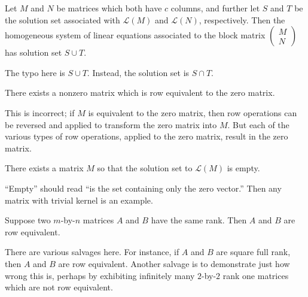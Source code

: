 \documentclass{homework}
\begin{document}
\begin{problem}
  Let $M$ and $N$ be matrices which both have $c$ columns, and further
  let $S$ and $T$ be the solution set associated with $\mathcal{L}(M)$
  and $\mathcal{L}(N)$, respectively.  Then the homogeneous system of
  linear equations associated to the block matrix $\begin{pmatrix} M \\
    N \end{pmatrix}$ has solution set $S \cup T$.
\end{problem}

\begin{solution}
  The typo here is  $S \cup T$.  Instead, the solution set is $S \cap T$.
\end{solution}

\begin{problem}
  There exists a nonzero matrix which is row equivalent to the zero matrix.
\end{problem}

\begin{solution}
  This is incorrect; if $M$ is equivalent to the zero matrix, then row operations can be reversed and applied to transform the zero matrix into $M$.  But each of the various types of row operations, applied to the zero matrix, result in the zero matrix.
\end{solution}

\begin{problem}
  There exists a matrix $M$ so that the solution set to $\mathcal{L}(M)$ is empty.
\end{problem}

\begin{solution}
  ``Empty'' should read ``is the set containing only the zero
  vector.''  Then any matrix with trivial kernel is an example.
\end{solution}

\begin{problem}
  Suppose two $m$-by-$n$ matrices $A$ and $B$ have the same rank.
  Then $A$ and $B$ are row equivalent.
\end{problem}

\begin{solution}
  There are various salvages here.  For instance, if $A$ and $B$ are
  square full rank, then $A$ and $B$ are row equivalent.  Another
  salvage is to demonstrate just how wrong this is, perhaps by
  exhibiting infinitely many $2$-by-$2$ rank one matrices which are
  not row equivalent.
\end{solution}
\end{document}
